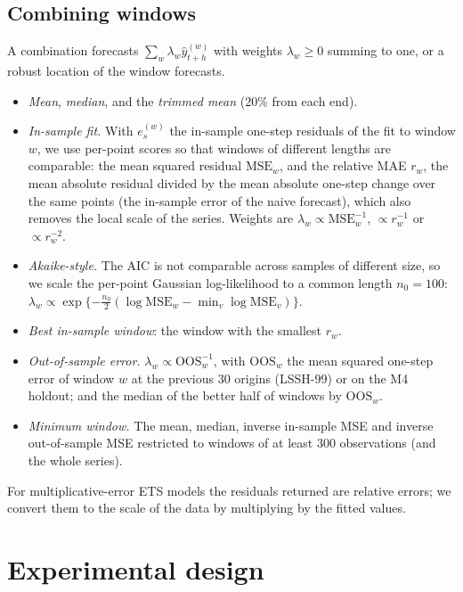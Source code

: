 \documentclass[11pt]{article}
\begin{document}
\subsection{Combining windows}
A combination forecasts $\sum_w \lambda_w \hat y^{(w)}_{t+h}$ with weights
$\lambda_w\ge 0$ summing to one, or a robust location of the window forecasts.
\begin{itemize}
\item \emph{Mean}, \emph{median}, and the \emph{trimmed mean} (20\% from each
end).
\item \emph{In-sample fit.} With $e^{(w)}_s$ the in-sample one-step residuals of
the fit to window $w$, we use per-point scores so that windows of different
lengths are comparable: the mean squared residual
$\mathrm{MSE}_w$, and the relative MAE $r_w$, the mean absolute residual divided
by the mean absolute one-step change over the same points (the in-sample error
of the naive forecast), which also removes the local scale of the series.
Weights are $\lambda_w\propto \mathrm{MSE}_w^{-1}$, $\propto r_w^{-1}$ or
$\propto r_w^{-2}$.
\item \emph{Akaike-style.} The AIC is not comparable across samples of
different size, so we scale the per-point Gaussian log-likelihood to a common
length $n_0=100$: $\lambda_w\propto\exp\{-\tfrac{n_0}{2}(\log\mathrm{MSE}_w-
\min_v\log\mathrm{MSE}_v)\}$.
\item \emph{Best in-sample window}: the window with the smallest $r_w$.
\item \emph{Out-of-sample error.} $\lambda_w\propto \mathrm{OOS}_w^{-1}$, with
$\mathrm{OOS}_w$ the mean squared one-step error of window $w$ at the previous 30
origins (LSSH-99) or on the M4 holdout; and the median of the better half of
windows by $\mathrm{OOS}_w$.
\item \emph{Minimum window.} The mean, median, inverse in-sample MSE and inverse
out-of-sample MSE restricted to windows of at least 300 observations (and the
whole series).
\end{itemize}
For multiplicative-error ETS models the residuals returned are relative errors;
we convert them to the scale of the data by multiplying by the fitted values.

\section{Experimental design}
\label{sec:design}
\end{document}
